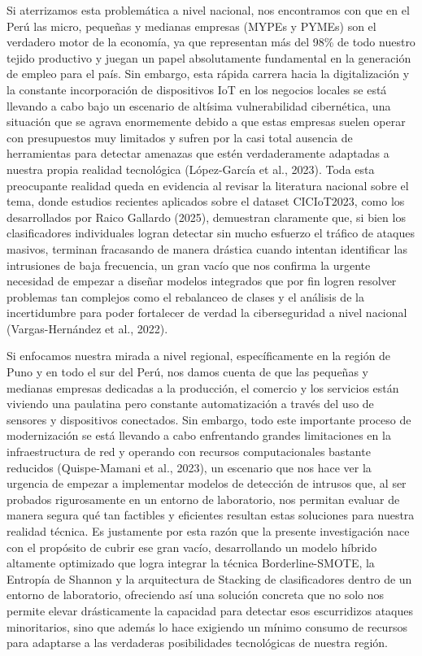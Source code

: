 Si aterrizamos esta problemática a nivel nacional, nos encontramos con que en el Perú las micro, pequeñas y medianas empresas (MYPEs y PYMEs) son el verdadero motor de la economía, ya que representan más del 98\% de todo nuestro tejido productivo y juegan un papel absolutamente fundamental en la generación de empleo para el país. Sin embargo, esta rápida carrera hacia la digitalización y la constante incorporación de dispositivos IoT en los negocios locales se está llevando a cabo bajo un escenario de altísima vulnerabilidad cibernética, una situación que se agrava enormemente debido a que estas empresas suelen operar con presupuestos muy limitados y sufren por la casi total ausencia de herramientas para detectar amenazas que estén verdaderamente adaptadas a nuestra propia realidad tecnológica (López-García et al., 2023). Toda esta preocupante realidad queda en evidencia al revisar la literatura nacional sobre el tema, donde estudios recientes aplicados sobre el dataset CICIoT2023, como los desarrollados por Raico Gallardo (2025), demuestran claramente que, si bien los clasificadores individuales logran detectar sin mucho esfuerzo el tráfico de ataques masivos, terminan fracasando de manera drástica cuando intentan identificar las intrusiones de baja frecuencia, un gran vacío que nos confirma la urgente necesidad de empezar a diseñar modelos integrados que por fin logren resolver problemas tan complejos como el rebalanceo de clases y el análisis de la incertidumbre para poder fortalecer de verdad la ciberseguridad a nivel nacional (Vargas-Hernández et al., 2022).

Si enfocamos nuestra mirada a nivel regional, específicamente en la región de Puno y en todo el sur del Perú, nos damos cuenta de que las pequeñas y medianas empresas dedicadas a la producción, el comercio y los servicios están viviendo una paulatina pero constante automatización a través del uso de sensores y dispositivos conectados. Sin embargo, todo este importante proceso de modernización se está llevando a cabo enfrentando grandes limitaciones en la infraestructura de red y operando con recursos computacionales bastante reducidos (Quispe-Mamani et al., 2023), un escenario que nos hace ver la urgencia de empezar a implementar modelos de detección de intrusos que, al ser probados rigurosamente en un entorno de laboratorio, nos permitan evaluar de manera segura qué tan factibles y eficientes resultan estas soluciones para nuestra realidad técnica. Es justamente por esta razón que la presente investigación nace con el propósito de cubrir ese gran vacío, desarrollando un modelo híbrido altamente optimizado que logra integrar la técnica Borderline-SMOTE, la Entropía de Shannon y la arquitectura de Stacking de clasificadores dentro de un entorno de laboratorio, ofreciendo así una solución concreta que no solo nos permite elevar drásticamente la capacidad para detectar esos escurridizos ataques minoritarios, sino que además lo hace exigiendo un mínimo consumo de recursos para adaptarse a las verdaderas posibilidades tecnológicas de nuestra región.


